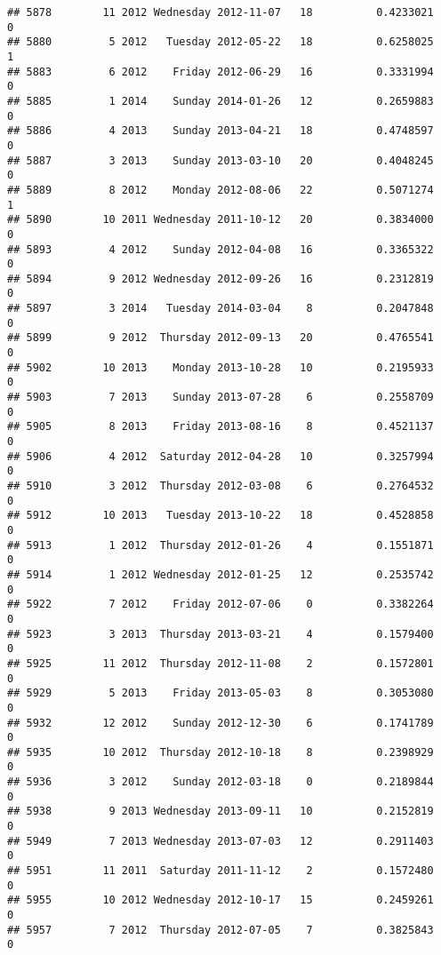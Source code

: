 \documentclass[
]{article}
\begin{document}
\begin{verbatim}
## 5878        11 2012 Wednesday 2012-11-07   18          0.4233021             0
## 5880         5 2012   Tuesday 2012-05-22   18          0.6258025             1
## 5883         6 2012    Friday 2012-06-29   16          0.3331994             0
## 5885         1 2014    Sunday 2014-01-26   12          0.2659883             0
## 5886         4 2013    Sunday 2013-04-21   18          0.4748597             0
## 5887         3 2013    Sunday 2013-03-10   20          0.4048245             0
## 5889         8 2012    Monday 2012-08-06   22          0.5071274             1
## 5890        10 2011 Wednesday 2011-10-12   20          0.3834000             0
## 5893         4 2012    Sunday 2012-04-08   16          0.3365322             0
## 5894         9 2012 Wednesday 2012-09-26   16          0.2312819             0
## 5897         3 2014   Tuesday 2014-03-04    8          0.2047848             0
## 5899         9 2012  Thursday 2012-09-13   20          0.4765541             0
## 5902        10 2013    Monday 2013-10-28   10          0.2195933             0
## 5903         7 2013    Sunday 2013-07-28    6          0.2558709             0
## 5905         8 2013    Friday 2013-08-16    8          0.4521137             0
## 5906         4 2012  Saturday 2012-04-28   10          0.3257994             0
## 5910         3 2012  Thursday 2012-03-08    6          0.2764532             0
## 5912        10 2013   Tuesday 2013-10-22   18          0.4528858             0
## 5913         1 2012  Thursday 2012-01-26    4          0.1551871             0
## 5914         1 2012 Wednesday 2012-01-25   12          0.2535742             0
## 5922         7 2012    Friday 2012-07-06    0          0.3382264             0
## 5923         3 2013  Thursday 2013-03-21    4          0.1579400             0
## 5925        11 2012  Thursday 2012-11-08    2          0.1572801             0
## 5929         5 2013    Friday 2013-05-03    8          0.3053080             0
## 5932        12 2012    Sunday 2012-12-30    6          0.1741789             0
## 5935        10 2012  Thursday 2012-10-18    8          0.2398929             0
## 5936         3 2012    Sunday 2012-03-18    0          0.2189844             0
## 5938         9 2013 Wednesday 2013-09-11   10          0.2152819             0
## 5949         7 2013 Wednesday 2013-07-03   12          0.2911403             0
## 5951        11 2011  Saturday 2011-11-12    2          0.1572480             0
## 5955        10 2012 Wednesday 2012-10-17   15          0.2459261             0
## 5957         7 2012  Thursday 2012-07-05    7          0.3825843             0

\end{verbatim}
\end{document}
